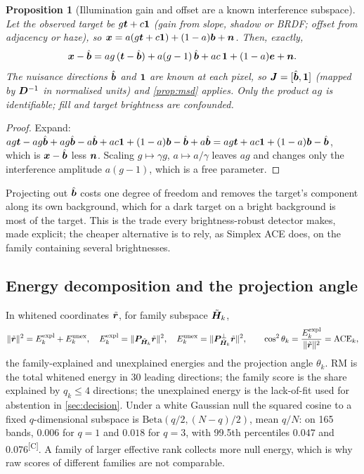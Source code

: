 \documentclass[11pt,a4paper]{article}
\theoremstyle{plain}
\newtheorem{proposition}{Proposition}[section]
\theoremstyle{definition}
\theoremstyle{remark}
\newcommand{\x}{\B{x}}
\newcommand{\bvec}{\B{b}}
\newcommand{\bh}{\hat{\B{b}}}
\newcommand{\tv}{\B{t}}
\newcommand{\rv}{\B{r}}
\newcommand{\ev}{\B{e}}
\newcommand{\nv}{\B{n}}
\newcommand{\one}{\B{1}}
\newcommand{\Hm}{\B{H}}
\newcommand{\Jm}{\B{J}}
\newcommand{\Pm}{\B{P}}
\newcommand{\Dm}{\B{D}}
\newcommand{\nrm}[1]{\lVert #1\rVert}
\newcommand{\comp}{\textsuperscript{\textsf{\scriptsize[C]}}}
\begin{document}
\begin{proposition}[Illumination gain and offset are a known interference subspace]
\label{prop:nuisance}
Let the observed target be $g\tv+c\one$ (gain from slope, shadow or BRDF; offset from adjacency or haze), so
$\x=a(g\tv+c\one)+(1-a)\bvec+\nv$. Then, exactly,
\[
  \x-\bh = ag\,(\tv-\bh)+a(g-1)\,\bh+ac\,\one+(1-a)\ev+\nv .
\]
The nuisance directions $\bh$ and $\one$ are known at each pixel, so $\Jm=[\bh,\one]$ (mapped by $\Dm^{-1}$ in normalised
units) and \cref{prop:msd} applies. Only the product $ag$ is identifiable; fill and target brightness are confounded.
\end{proposition}
\begin{proof}
Expand: $ag\tv-ag\bh+ag\bh-a\bh+ac\one+(1-a)\bvec-\bh+a\bh = ag\tv+ac\one+(1-a)\bvec-\bh$, which is $\x-\bh$ less
$\nv$. Scaling $g\mapsto\gamma g$, $a\mapsto a/\gamma$ leaves $ag$ and changes only the interference amplitude
$a(g-1)$, which is a free parameter.
\end{proof}

Projecting out $\bh$ costs one degree of freedom and removes the target's component along its own background, which
for a dark target on a bright background is most of the target. This is the trade every brightness-robust detector
makes, made explicit; the cheaper alternative is to rely, as Simplex ACE does, on the family containing several
brightnesses.

\subsection{Energy decomposition and the projection angle}

In whitened coordinates $\tilde{\rv}$, for family subspace $\tilde{\Hm}_k$,
\[
  \nrm{\tilde{\rv}}^2=E_k^{\rm expl}+E_k^{\rm unex},\quad
  E_k^{\rm expl}=\nrm{\Pm_{\tilde{\Hm}_k}\tilde{\rv}}^2,\quad
  E_k^{\rm unex}=\nrm{\Pm^\perp_{\tilde{\Hm}_k}\tilde{\rv}}^2,\qquad
  \cos^2\theta_k=\frac{E_k^{\rm expl}}{\nrm{\tilde{\rv}}^2}=\mathrm{ACE}_k ,
\]
the family-explained and unexplained energies and the projection angle $\theta_k$.
RM is the total whitened energy in 30 leading directions; the family score is the share explained by $q_k\le4$
directions; the unexplained energy is the lack-of-fit used for abstention in \cref{sec:decision}. Under a white
Gaussian null the squared cosine to a fixed $q$-dimensional subspace is $\mathrm{Beta}(q/2,(N-q)/2)$, mean $q/N$: on 165
bands, $0.006$ for $q=1$ and $0.018$ for $q=3$, with 99.5th percentiles $0.047$ and $0.076$\comp. A family of larger
effective rank collects more null energy, which is why raw scores of different families are not comparable.
\end{document}
